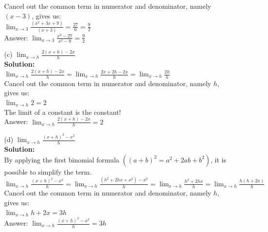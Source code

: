 \documentclass[a4paper]{article}
\begin{document}
\begin{enumerate}
\begin{itemize}
Cancel out the common term in numerator and denominator, namely $(x-3)$, gives us:\\	

$\lim_{x \to 3} \frac{(x^2 + 3x + 9)}{(x+3)} = \frac{27}{6} = \frac{9}{2}$\\

Answer: $\lim_{x \to 3} \frac{x^3 - 27}{x^2 -9} = \frac{9}{2}$\\
	
	\item[(c)] $\lim_{x \to h} \frac{2(x + h) - 2x}{h}$\\
	
	\textbf{Solution:}\\
	
	$\lim_{x \to h} \frac{2(x + h) - 2x}{h} = \lim_{x \to h} \frac{2x + 2h - 2x}{h} = \lim_{x \to h} \frac{2h}{h}$\\
	
	Cancel out the common term in numerator and denominator, namely $h$, gives us:\\
	
	$\lim_{x \to h} 2 = 2$\\
	
	The limit of a constant is the constant!\\
	
Answer: $\lim_{x \to h} \frac{2(x + h) - 2x}{h} = 2$\\	
	
	\item[(d)] $\lim_{x \to h} \frac{(x + h)^2 - x^2}{h}$\\

	\textbf{Solution:}\\
	
	By applying the first binomial formula $((a+b)^2 = a^2 + 2ab + b^2)$, it is possible to simplify the term.\\
	
		$\lim_{x \to h} \frac{(x + h)^2 - x^2}{h} = \lim_{x \to h} \frac{(h^2 + 2hx + x^2) - x^2}{h} = \lim_{x \to h} \frac{h^2 + 2hx}{h} = \lim_{x \to h} \frac{h(h + 2x)}{h}$\\

Cancel out the common term in numerator and denominator, namely $h$, gives us:\\

$\lim_{x \to h} h + 2x = 3h$\\
	

Answer: $\lim_{x \to h} \frac{(x + h)^2 - x^2}{h} = 3h$\\	

\end{itemize}


\end{enumerate}
\end{document}
